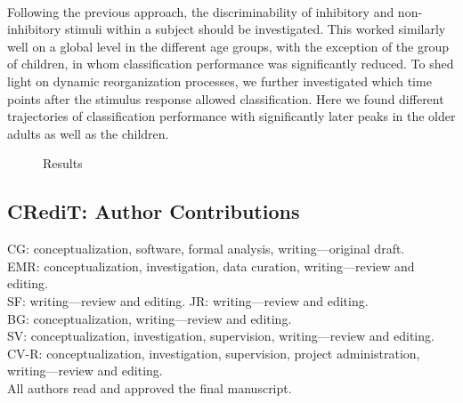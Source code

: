 \\
Following the previous approach, the discriminability of inhibitory and non-inhibitory stimuli within a subject should be investigated. This worked similarly well on a global level in the different age groups, with the exception of the group of children, in whom classification performance was significantly reduced.
To shed light on dynamic reorganization processes, we further investigated which time points after the stimulus response allowed classification. Here we found different trajectories of classification performance with significantly later peaks in the older adults as well as the children. 

\begin{figure}[h]
\begin{center}

\caption[Reuslts]{Results}
\label{fig:results2}
\end{center}
\end{figure}

\subsection*{CRediT: Author Contributions}
CG: conceptualization, software, formal analysis, writing—original draft.\\
EMR: conceptualization, investigation, data curation, writing—review and editing.\\
SF: writing—review and editing. JR: writing—review and editing.\\ 
BG: conceptualization, writing—review and editing.\\ 
SV: conceptualization, investigation, supervision, writing—review and editing.\\ 
CV-R: conceptualization, investigation, supervision, project administration, writing—review and editing.\\ 
All authors read and approved the final manuscript.\\

